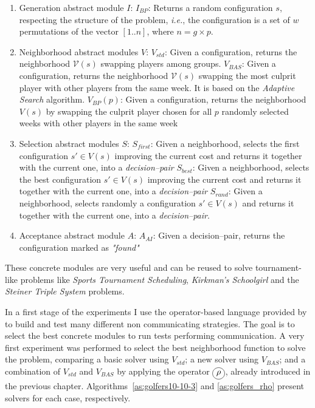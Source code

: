 \begin{enumerate}
	\item Generation abstract module $I$:
	\subitem $I_{BP}$: Returns a random configuration $s$, respecting the structure of the problem, {\it i.e.}, the configuration is a set of $w$ permutations of the vector $[1..n]$, where $n=g\times p$.
	\item Neighborhood abstract modules $V$:
	\subitem $V_{std}$: Given a configuration, returns the neighborhood $\mathcal{V}\left(s\right)$ swapping players among groups.
	\subitem $V_{BAS}$: Given a configuration, returns the neighborhood $\mathcal{V}\left(s\right)$ swapping the most culprit player with other players from the same week. It is based on the {\it Adaptive Search} algorithm.
	\subitem $V_{BP}(p)$: Given a configuration, returns the neighborhood $V\left(s\right)$ by swapping the culprit player chosen for all $p$ randomly selected weeks with other players in the same week
	\item Selection abstract modules $S$:
	\subitem $S_{first}$: Given a neighborhood, selects the first configuration $s' \in V\left(s\right)$ improving the current cost and returns it together with the current one, into a \textit{decision--pair}
	\subitem $S_{best}$: Given a neighborhood, selects the best configuration $s' \in V\left(s\right)$ improving the current cost and returns it together with the current one, into a \textit{decision--pair}
	\subitem $S_{rand}$: Given a neighborhood, selects randomly a configuration $s' \in V\left(s\right)$ and returns it together with the current one, into a \textit{decision--pair}.
	\item Acceptance abstract module $A$:
	\subitem $A_{AI}$: Given a decision--pair, returns the configuration marked as \textit{"found"}
\end{enumerate}

These concrete modules are very useful and can be reused to solve tournament-like problems like \textit{Sports Tournament Scheduling}, \textit{Kirkman's Schoolgirl} and the \textit{Steiner Triple System} problems.

In a first stage of the experiments I use the operator-based language provided by \posl{} to build and test many different non communicating strategies. The goal is to select the best concrete modules to run tests performing communication. A very first experiment was performed to select the best neighborhood function to solve the problem, comparing a basic solver using $V_{std}$; a new solver using $V_{BAS}$; and a combination of $V_{std}$ and $V_{BAS}$ by applying the operator $\circled{$\rho$}$, already introduced in the previous chapter. Algorithms~\ref{as:golfers10-10-3} and \ref{as:golfers_rho} present solvers for each case, respectively.

